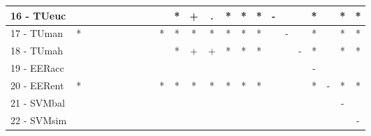 \begin{table}[h]
\begin{center}
\begin{tabular}{lcc|cc|cc|cc|cc|cc|cc|cc|cc|cc|cc}
16 - TUeuc	&   &   &   &   &   &   &   &   &   & * & + & . & * & * & * & - &   &   & * &   & * & * \\ \hline
17 - TUman	& * &   &   &   &   &   &   &   & * & * & * & * & * & * & * &   & - &   & * &   & * & * \\
18 - TUmah	&   &   &   &   &   &   &   &   &   & * & + & + & * & * & * &   &   & - & * &   & * & * \\ \hline
19 - EERacc	&   &   &   &   &   &   &   &   &   &   &   &   &   &   &   &   &   &   & - &   &   &   \\
20 - EERent	& * &   &   &   &   &   &   &   & * & * & * & * & * & * & * &   &   &   & * & - & * & * \\ \hline
21 - SVMbal	&   &   &   &   &   &   &   &   &   &   &   &   &   &   &   &   &   &   &   &   & - &   \\
22 - SVMsim	&   &   &   &   &   &   &   &   &   &   &   &   &   &   &   &   &   &   &   &   &   & - \\ \hline\end{tabular}

\label{stratsfried5NN}
\end{center}
\end{table}